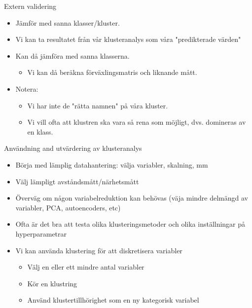 \documentclass[10pt,english]{beamer}
\begin{document}
\begin{frame}{Extern validering}

    \begin{itemize}
        \item Jämför med sanna klasser/kluster.
        \item Vi kan ta resultatet från vår klusteranalys som våra "predikterade värden"
        \item Kan då jämföra med sanna klasserna.
        \begin{itemize}
            \item Vi kan då beräkna förväxlingsmatris och liknande mått.
        \end{itemize}
        \item Notera:
        \begin{itemize}
            \item Vi har inte de "rätta namnen" på våra kluster.
            \item Vi vill ofta att klustren ska vara så rena som möjligt, dvs. domineras av en klass.
        \end{itemize}
    \end{itemize}
    
\end{frame}


\begin{frame}{Användning and utvärdering av klusteranalys}

    \begin{itemize}
        \item Börja med lämplig datahantering: välja variabler, skalning, mm
        \item Välj lämpligt avståndsmått/närhetsmått
        \item Överväg om någon variabelreduktion kan behövas (väja mindre delmängd av variabler, PCA, autoencoders, etc)
        \item Ofta är det bra att testa olika klusteringsmetoder och olika inställningar på hyperparametrar
        \item Vi kan använda klustering för att diskretisera variabler
        \begin{itemize}
          \item Välj en eller ett mindre antal variabler
          \item Kör en klustring
          \item Använd klustertillhörighet som en ny kategorisk variabel
        \end{itemize}
    \end{itemize}
    
\end{frame}
\end{document}
